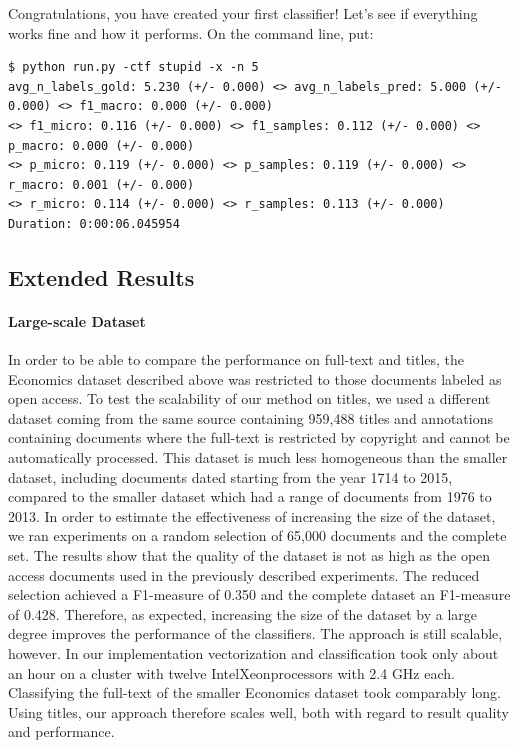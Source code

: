 \documentclass{article}
\begin{document}
Congratulations, you have created your first classifier! Let's see if everything works fine and how it performs.
On the command line, put:
\begin{lstlisting}[basicstyle=\ttfamily]
$ python run.py -ctf stupid -x -n 5
avg_n_labels_gold: 5.230 (+/- 0.000) <> avg_n_labels_pred: 5.000 (+/- 0.000) <> f1_macro: 0.000 (+/- 0.000)
<> f1_micro: 0.116 (+/- 0.000) <> f1_samples: 0.112 (+/- 0.000) <> p_macro: 0.000 (+/- 0.000)
<> p_micro: 0.119 (+/- 0.000) <> p_samples: 0.119 (+/- 0.000) <> r_macro: 0.001 (+/- 0.000)
<> r_micro: 0.114 (+/- 0.000) <> r_samples: 0.113 (+/- 0.000)
Duration: 0:00:06.045954
\end{lstlisting}
\subsection{Extended Results}
\label{sec:extended_results}

\paragraph{Large-scale Dataset}
In order to be able to compare the performance on full-text and titles, the Economics
dataset described above was restricted to those documents labeled as open access.
To test the scalability of our method on titles, we used a different dataset coming from the same source
containing 959,488 titles and annotations containing documents where the full-text is restricted by copyright
and cannot be automatically processed.
This dataset is much less homogeneous than the smaller dataset,
including documents dated starting from the year 1714 to 2015,
compared to the smaller dataset which had a range of documents from 1976 to 2013.
In order to estimate the effectiveness of increasing the size of the dataset,
we ran experiments on a random selection of 65,000 documents and the complete set.
The results show that the quality of the dataset is not as high as
the open access documents used in the previously described experiments.
The reduced selection achieved a F1-measure of 0.350 and the complete dataset an F1-measure of 0.428.
Therefore, as expected, increasing the size of the dataset by a large degree improves the performance of the classifiers.
The approach is still scalable, however.
In our implementation vectorization and classification took only about an hour on a cluster with twelve
Intel\textregistered Xeon\textregistered processors with 2.4 GHz each.
Classifying the full-text of the smaller Economics dataset took comparably long.
Using titles, our approach therefore scales well, both with regard to result quality and performance.
\end{document}
